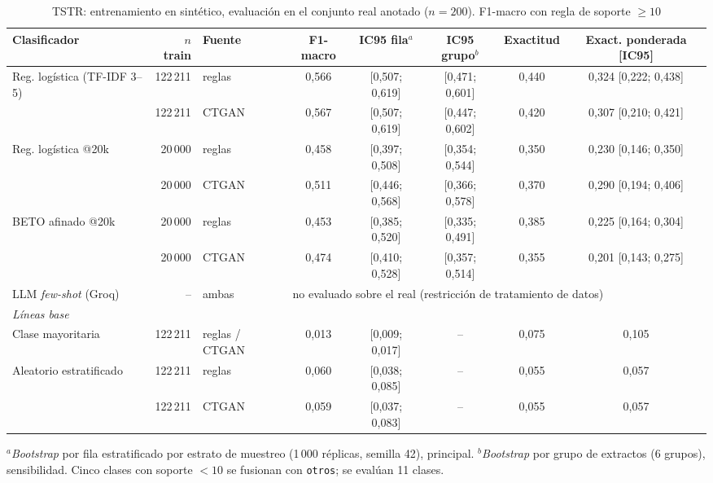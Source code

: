 \documentclass[journal]{IEEEtai}
\begin{document}
\begin{table}[!t]
\caption{TSTR: entrenamiento en sintético, evaluación en el conjunto real anotado ($n=200$). F1-macro con regla de soporte $\geq 10$}
\label{tab:tstr}
\centering
\footnotesize
\begin{tabular}{lrlccccc}
\toprule
Clasificador & $n$ train & Fuente & F1-macro & IC95 fila$^{a}$ & IC95 grupo$^{b}$ & Exactitud & Exact. ponderada [IC95] \\
\midrule
Reg. logística (TF-IDF 3--5) & 122\,211 & reglas & 0{,}566 & [0{,}507; 0{,}619] & [0{,}471; 0{,}601] & 0{,}440 & 0{,}324 [0{,}222; 0{,}438] \\
 & 122\,211 & CTGAN & 0{,}567 & [0{,}507; 0{,}619] & [0{,}447; 0{,}602] & 0{,}420 & 0{,}307 [0{,}210; 0{,}421] \\
\addlinespace
Reg. logística @20k & 20\,000 & reglas & 0{,}458 & [0{,}397; 0{,}508] & [0{,}354; 0{,}544] & 0{,}350 & 0{,}230 [0{,}146; 0{,}350] \\
 & 20\,000 & CTGAN & 0{,}511 & [0{,}446; 0{,}568] & [0{,}366; 0{,}578] & 0{,}370 & 0{,}290 [0{,}194; 0{,}406] \\
\addlinespace
BETO afinado @20k & 20\,000 & reglas & 0{,}453 & [0{,}385; 0{,}520] & [0{,}335; 0{,}491] & 0{,}385 & 0{,}225 [0{,}164; 0{,}304] \\
 & 20\,000 & CTGAN & 0{,}474 & [0{,}410; 0{,}528] & [0{,}357; 0{,}514] & 0{,}355 & 0{,}201 [0{,}143; 0{,}275] \\
\addlinespace
LLM \textit{few-shot} (Groq) & -- & ambas & \multicolumn{5}{l}{no evaluado sobre el real (restricción de tratamiento de datos)} \\
\midrule
\multicolumn{8}{l}{\textit{Líneas base}} \\
Clase mayoritaria & 122\,211 & reglas / CTGAN & 0{,}013 & [0{,}009; 0{,}017] & -- & 0{,}075 & 0{,}105 \\
Aleatorio estratificado & 122\,211 & reglas & 0{,}060 & [0{,}038; 0{,}085] & -- & 0{,}055 & 0{,}057 \\
 & 122\,211 & CTGAN & 0{,}059 & [0{,}037; 0{,}083] & -- & 0{,}055 & 0{,}057 \\
\bottomrule
\end{tabular}
\par\smallskip\footnotesize $^{a}$\textit{Bootstrap} por fila estratificado por estrato de muestreo (1\,000 réplicas, semilla 42), principal. $^{b}$\textit{Bootstrap} por grupo de extractos (6 grupos), sensibilidad. Cinco clases con soporte $<10$ se fusionan con \texttt{otros}; se evalúan 11 clases.
\end{table}
\end{document}
